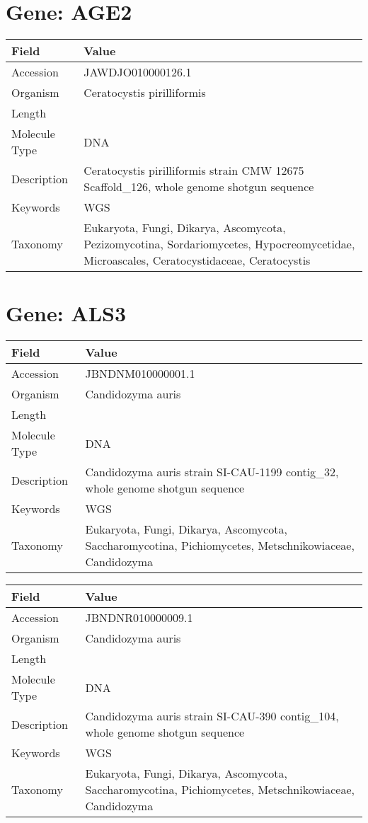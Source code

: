 \documentclass[10pt]{article}
\begin{document}
\section*{Gene: AGE2}
{\footnotesize
\begin{longtable}{>{\raggedright\arraybackslash}p{4.5cm} >{\raggedright\arraybackslash}p{11.5cm}}
\textbf{Field} & \textbf{Value} \\
\hline
Accession & JAWDJO010000126.1 \\
Organism & Ceratocystis pirilliformis \\
Length & 68192 \\
Molecule Type & DNA \\
Description & Ceratocystis pirilliformis strain CMW 12675 Scaffold\_126, whole genome shotgun sequence \\
Keywords & WGS \\
Taxonomy & Eukaryota, Fungi, Dikarya, Ascomycota, Pezizomycotina, Sordariomycetes, Hypocreomycetidae, Microascales, Ceratocystidaceae, Ceratocystis \\
\end{longtable}
}


\section*{Gene: ALS3}
{\footnotesize
\begin{longtable}{>{\raggedright\arraybackslash}p{4.5cm} >{\raggedright\arraybackslash}p{11.5cm}}
\textbf{Field} & \textbf{Value} \\
\hline
Accession & JBNDNM010000001.1 \\
Organism & Candidozyma auris \\
Length & 780289 \\
Molecule Type & DNA \\
Description & Candidozyma auris strain SI-CAU-1199 contig\_32, whole genome shotgun sequence \\
Keywords & WGS \\
Taxonomy & Eukaryota, Fungi, Dikarya, Ascomycota, Saccharomycotina, Pichiomycetes, Metschnikowiaceae, Candidozyma \\
\end{longtable}
}

{\footnotesize
\begin{longtable}{>{\raggedright\arraybackslash}p{4.5cm} >{\raggedright\arraybackslash}p{11.5cm}}
\textbf{Field} & \textbf{Value} \\
\hline
Accession & JBNDNR010000009.1 \\
Organism & Candidozyma auris \\
Length & 773430 \\
Molecule Type & DNA \\
Description & Candidozyma auris strain SI-CAU-390 contig\_104, whole genome shotgun sequence \\
Keywords & WGS \\
Taxonomy & Eukaryota, Fungi, Dikarya, Ascomycota, Saccharomycotina, Pichiomycetes, Metschnikowiaceae, Candidozyma \\
\end{longtable}
}
\end{document}
